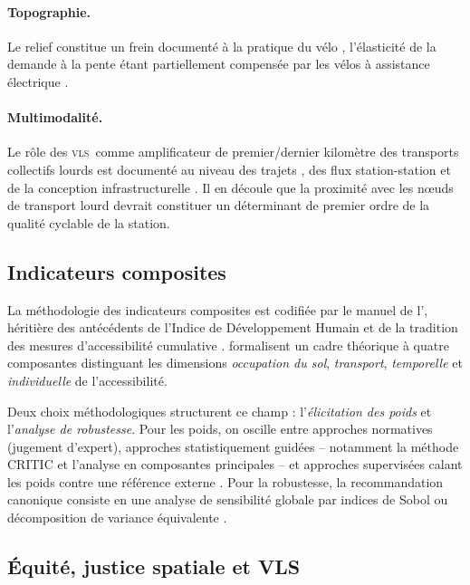 \documentclass[11pt,a4paper]{article}
\newcommand{\VLS}{\textsc{vls}\xspace}
\begin{document}
\paragraph{Topographie.}
Le relief constitue un frein documenté à la pratique du vélo
\citep{Parkin2008, Rietveld2004, Heinen2010}, l'élasticité de la
demande à la pente étant partiellement compensée par les vélos à
assistance électrique \citep{Fishman2016, Eren2020}.

\paragraph{Multimodalité.}
Le rôle des \VLS\ comme amplificateur de premier/dernier
kilomètre des transports collectifs lourds est documenté au
niveau des trajets \citep{Saberi2018}, des flux station-station
\citep{FaghihImani2014} et de la conception infrastructurelle
\citep{Martens2007, ElGeneidy2016}. Il en découle que la
proximité avec les nœuds de transport lourd devrait constituer
un déterminant de premier ordre de la qualité cyclable de la
station.

\subsection{Indicateurs composites}

La méthodologie des indicateurs composites est codifiée par le
manuel de l'\citet{OECD2008}, héritière des antécédents de
l'Indice de Développement Humain \citep{PNUD1990} et de la
tradition des mesures d'accessibilité cumulative
\citep{Levinson2002, ElGeneidy2016}. \citet{Geurs2004} formalisent
un cadre théorique à quatre composantes distinguant les
dimensions \emph{occupation du sol}, \emph{transport},
\emph{temporelle} et \emph{individuelle} de l'accessibilité.

Deux choix méthodologiques structurent ce champ : l'\emph{élicitation
des poids} et l'\emph{analyse de robustesse}. Pour les poids, on
oscille entre approches normatives (jugement d'expert), approches
statistiquement guidées -- notamment la méthode CRITIC
\citep{Diakoulaki1995} et l'analyse en composantes principales
\citep{Nardo2005} -- et approches supervisées calant les poids
contre une référence externe \citep{Saisana2005, OECD2008}.
Pour la robustesse, la recommandation canonique consiste en une
analyse de sensibilité globale par indices de Sobol ou
décomposition de variance équivalente \citep{Saltelli2008,
Sobol1993}.

\subsection{Équité, justice spatiale et VLS}
\end{document}
